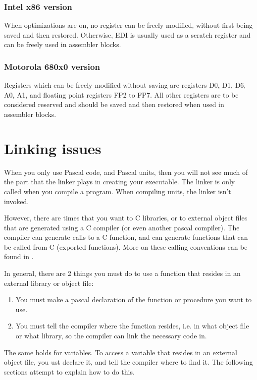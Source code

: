 \documentclass{report}
\begin{document}
\subsection{ Intel x86 version }

When optimizations are on, no register can be freely modified, without
first being saved and then restored. Otherwise, EDI is usually used as
a scratch register and can be freely used in assembler blocks.

\subsection{ Motorola 680x0 version }

Registers which can be freely modified without saving are registers
D0, D1, D6, A0, A1, and floating point registers FP2 to FP7. All other
registers are to be considered reserved and should be saved and then
restored when used in assembler blocks.

\chapter{Linking issues}
\label{ch:Linking}
When you only use Pascal code, and Pascal units, then you will not see much
of the part that the linker plays in creating your executable.
The linker is only called when you compile a program. When compiling units,
the linker isn't invoked.

However, there are times that you want to C libraries, or to external
object files that are generated using a C compiler (or even another pascal
compiler). The \fpc compiler can generate calls to a C function,
and can generate functions that can be called from C (exported functions).
More on these calling conventions can be found in .

In general, there are 2 things you must do to use a function that resides in
an external library or object file:
\begin{enumerate}
\item You must make a pascal declaration of the function or procedure you
want to use.
\item You must tell the compiler where the function resides, i.e. in what
object file or what library, so the compiler can link the necessary code in.
\end{enumerate}
The same holds for variables. To access a variable that resides in an
external object file, you ust declare it, and tell the compiler where to
find it.
The following sections attempt to explain how to do this.
\end{document}

